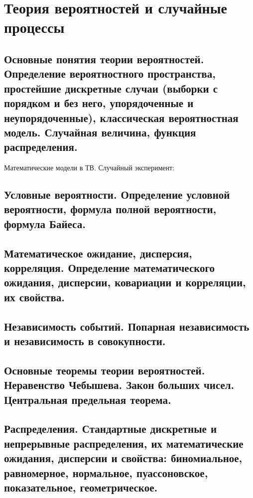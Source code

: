 \chapter{Теория вероятностей и случайные\\\hfill процессы}

\begin{multicols}{2}
    \raggedcolumns 
    \section{Основные понятия теории вероятностей. Определение вероятностного пространства,
    простейшие дискретные случаи (выборки с порядком и без него, упорядоченные и
    неупорядоченные), классическая вероятностная модель. Случайная величина, функция
    распределения.}
    Математические модели в ТВ. Случайный эксперимент:
    \section{Условные вероятности. Определение условной вероятности, формула полной
    вероятности, формула Байеса.}

    \section{Математическое ожидание, дисперсия, корреляция. Определение математического
    ожидания, дисперсии, ковариации и корреляции, их свойства.}

    \section{Независимость событий. Попарная независимость и независимость в совокупности.}

    \section{Основные теоремы теории вероятностей. Неравенство Чебышева. Закон больших чисел.
    Центральная предельная теорема.
    }

    \section{Распределения. Стандартные дискретные и непрерывные распределения, их
    математические ожидания, дисперсии и свойства: биномиальное, равномерное,
    нормальное, пуассоновское, показательное, геометрическое.}
\end{multicols}